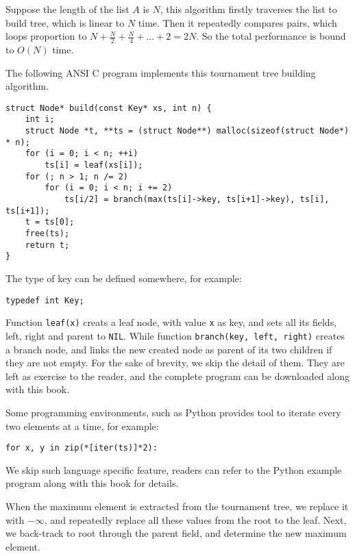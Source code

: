 \documentclass{article}
\begin{document}
Suppose the length of the list $A$ is $N$, this algorithm firstly traverses the list to build tree,
which is linear to $N$ time. Then it repeatedly compares pairs, which loops proportion to
$N + \frac{N}{2} + \frac{N}{4} + ... + 2 = 2N$. So the total performance is bound to $O(N)$ time.

The following ANSI C program implements this tournament tree building algorithm.

\lstset{language=C}
\begin{lstlisting}
struct Node* build(const Key* xs, int n) {
    int i;
    struct Node *t, **ts = (struct Node**) malloc(sizeof(struct Node*) * n);
    for (i = 0; i < n; ++i)
        ts[i] = leaf(xs[i]);
    for (; n > 1; n /= 2)
        for (i = 0; i < n; i += 2)
            ts[i/2] = branch(max(ts[i]->key, ts[i+1]->key), ts[i], ts[i+1]);
    t = ts[0];
    free(ts);
    return t;
}
\end{lstlisting}

The type of key can be defined somewhere, for example:

\lstset{language=C}
\begin{lstlisting}
typedef int Key;
\end{lstlisting}

Function \verb|leaf(x)| creats a leaf node, with value \verb|x| as key,
and sets all its fields, left, right and parent to \verb|NIL|.
While function \verb|branch(key, left, right)| creates a branch node, and links the new
created node as parent of its two children if they are not empty. For the sake of
brevity, we skip the detail of them. They are left as exercise to the reader, and
the complete program can be downloaded along with this book.

Some programming environments, such as Python provides tool to iterate every two elements
at a time, for example:

\lstset{language=Python}
\begin{lstlisting}
for x, y in zip(*[iter(ts)]*2):
\end{lstlisting}

We skip such language specific feature, readers can refer to the Python example program
along with this book for details.

When the maximum element is extracted from the tournament tree, we replace it with $-\infty$,
and repeatedly replace all these values from the root to the leaf. Next, we back-track
to root through the parent field, and determine the new maximum element.
\end{document}
